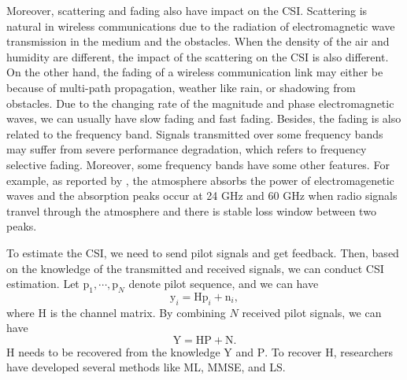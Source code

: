 \documentclass[10pt,journal,cspaper,compsoc]{IEEEtran}
\begin{document}
Moreover, scattering and fading also have impact on the CSI. Scattering is natural in wireless communications due to the radiation of electromagnetic wave transmission in the medium and the obstacles. When the density of the air and humidity are different, the impact of the scattering on the CSI is also different. On the other hand, the fading of a wireless communication link may either be because of multi-path propagation, weather like rain, or shadowing from obstacles. Due to the changing rate of the magnitude and phase electromagnetic waves, we can usually have slow fading and fast fading. Besides, the fading is also related to the frequency band. Signals transmitted over some frequency bands may suffer from severe performance degradation, which refers to frequency selective fading. Moreover, some frequency bands have some other features. For example, as reported by \cite{MP05}, the atmosphere absorbs the power of electromagenetic waves and the absorption peaks occur at 24 GHz and 60 GHz when radio signals tranvel through the atmosphere and there is stable loss window between two peaks.

To estimate the CSI, we need to send pilot signals and get feedback. Then, based on the knowledge of the transmitted and received signals, we can conduct CSI estimation. Let $\textrm{p}_{1}, \cdots, \textrm{p}_{N}$ denote pilot sequence, and we can have
\begin{equation}
\textrm{y}_{i} = \textrm{H}\textrm{p}_{i} + \textrm{n}_{i},
\end{equation}
where $\textrm{H}$ is the channel matrix. By combining $N$ received pilot signals, we can have
\begin{equation}
\textrm{Y} = \textrm{H}\textrm{P} + \textrm{N}.
\end{equation}
$\textrm{H}$ needs to be recovered from the knowledge $\textrm{Y}$ and $\textrm{P}$. To recover $\textrm{H}$, researchers have developed several methods like ML, MMSE, and LS.


\end{document}
